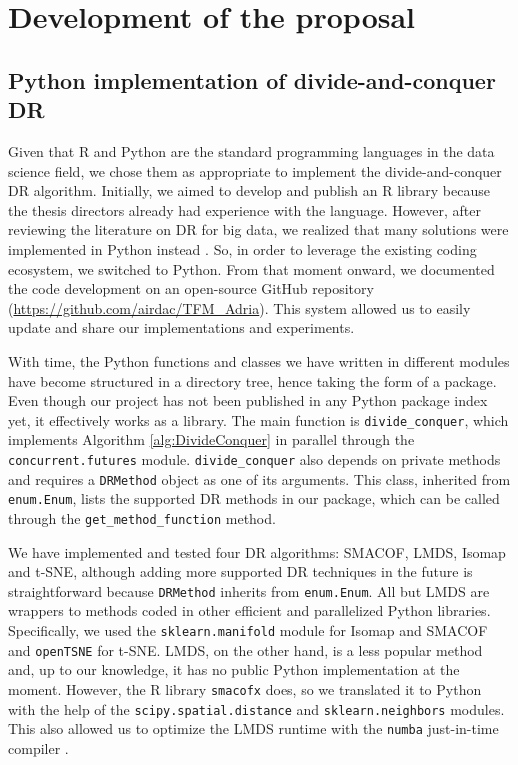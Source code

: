 \section{Development of the proposal}

\subsection{Python implementation of divide-and-conquer DR}
\label{sec:Python-implementation-of-divide-and-conquer-DR}

Given that R and Python are the standard programming languages in the data science field, we chose them as appropriate to implement the divide-and-conquer  DR algorithm. Initially, we aimed to develop and publish an R library because the thesis directors already had experience with the language. However, after reviewing the literature on DR for big data, we realized that many solutions were implemented in Python instead \citep{Reichmann2024}. So, in order to leverage the existing coding ecosystem, we switched to Python. From that moment onward, we documented the code development on an open-source GitHub repository (\href{https://github.com/airdac/TFM_Adria}{https://github.com/airdac/TFM\_Adria}). This system allowed us to easily update and share our implementations and experiments.

With time, the Python functions and classes we have written in different modules have become structured in a directory tree, hence taking the form of a package. Even though our project has not been published in any Python package index yet, it effectively works as a library. The main function is \verb|divide_conquer|, which implements Algorithm \ref{alg:DivideConquer} in parallel through the \verb|concurrent.futures| module. \verb|divide_conquer| also depends on private methods and requires a \verb|DRMethod| object as one of its arguments. This class, inherited from \verb|enum.Enum|, lists the supported DR methods in our package, which can be called through the \verb|get_method_function| method.

We have implemented and tested four DR algorithms: SMACOF, LMDS, Isomap and t-SNE, although adding more supported DR techniques in the future is straightforward because \verb|DRMethod| inherits from \verb|enum.Enum|. All but LMDS are wrappers to methods coded in other efficient and parallelized Python libraries. Specifically, we used the \verb|sklearn.manifold| module \citep{Pedregosa2011} for Isomap and SMACOF and \verb|openTSNE| \citep{Poličar2023} for t-SNE. LMDS, on the other hand, is a less popular method and, up to our knowledge, it has no public Python implementation at the moment. However, the R library \verb|smacofx| \citep{Leeuw2009} does, so we translated it to Python with the help of the \verb|scipy.spatial.distance| and \verb|sklearn.neighbors| modules. This also allowed us to optimize the LMDS runtime with the \verb|numba| just-in-time compiler \citep{Lam2015, Aycock2003}.

